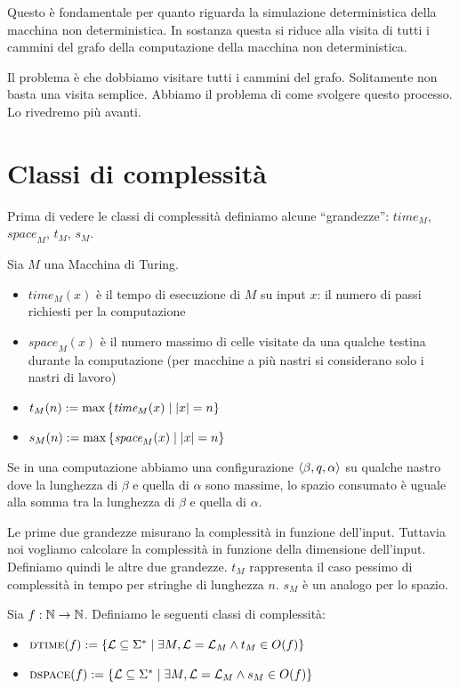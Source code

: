 Questo è fondamentale per quanto riguarda la simulazione deterministica della macchina non
deterministica. In sostanza questa si riduce alla visita di tutti i cammini del grafo della
computazione della macchina non deterministica.

Il problema è che dobbiamo visitare tutti i cammini del grafo. Solitamente non basta una visita
semplice. Abbiamo il problema di come svolgere questo processo. Lo rivedremo più avanti.

\section{Classi di complessità}

Prima di vedere le classi di complessità definiamo alcune ``grandezze'': $\textit{time}_{M}$,
$\textit{space}_{M}$, $t_{M}$, $s_{M}$.

\begin{defn}
    Sia $M$ una Macchina di Turing.
    \begin{itemize}
        \item $\textit{time}_{M}(x)$ è il tempo di esecuzione di $M$ su input $x$: il numero di
        passi richiesti per la computazione
        \item $\textit{space}_{M}(x)$ è il numero massimo di celle visitate da una qualche testina
        durante la computazione (per macchine a più nastri si considerano solo i nastri di lavoro)
        \item $t_{M}(n) := \max\left\{\textit{time}_{M}(x) \mid |x| = n\right\}$
        \item $s_{M}(n) := \max\left\{\textit{space}_{M}(x) \mid |x| = n\right\}$
    \end{itemize}
\end{defn}

Se in una computazione abbiamo una configurazione $\langle \beta, q, \alpha \rangle$ su qualche nastro dove
la lunghezza di $\beta$ e quella di $\alpha$ sono massime, lo spazio consumato è uguale alla somma tra la
lunghezza di $\beta$ e quella di $\alpha$.

Le prime due grandezze misurano la complessità in funzione dell'input. Tuttavia noi vogliamo
calcolare la complessità in funzione della dimensione dell'input. Definiamo quindi le altre due
grandezze. $t_{M}$ rappresenta il caso pessimo di complessità in tempo per stringhe di lunghezza
$n$. $s_{M}$ è un analogo per lo spazio.

\begin{defn}
    Sia $f:\mathbb{N} \to \mathbb{N}$. Definiamo le seguenti classi di complessità:
    \begin{itemize}
        \item $\textsc{dtime}(f) := \left\{\mathcal{L} \subseteq \Sigma^{*} \mid \exists M, \mathcal{L} = \mathcal{L}_{M} \land
        t_{M} \in O(f)\right\}$
        \item $\textsc{dspace}(f) := \left\{\mathcal{L} \subseteq \Sigma^{*} \mid \exists M, \mathcal{L} = \mathcal{L}_{M} \land
        s_{M} \in O(f)\right\}$
    \end{itemize}
\end{defn}

